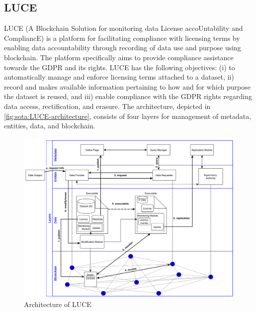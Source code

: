 \subsection{LUCE}
LUCE \cite{havelange_luce:_2019} (A Blockchain Solution for monitoring data License accoUntability and CompliancE) is a platform for facilitating compliance with licensing terms by enabling data accountability through recording of data use and purpose using blockchain. The platform specifically aims to provide compliance assistance towards the GDPR and its rights. LUCE has the following objectives: (i) to automatically manage and enforce licensing terms attached to a dataset, ii) record and makes available information pertaining to how and for which purpose the dataset is reused, and iii) enable compliance with the GDPR rights regarding data access, rectification, and erasure. The architecture, depicted in \autoref{fig:sota:LUCE-architecture}, consists of four layers for management of metadata, entities, data, and blockchain. 
\begin{figure}[htbp]
    \centering
    \includegraphics[width=\linewidth]{img/LUCE_architecture.png}
    \caption{Architecture of LUCE \cite{havelange_luce:_2019}}
    \label{fig:sota:LUCE-architecture}
\end{figure}

